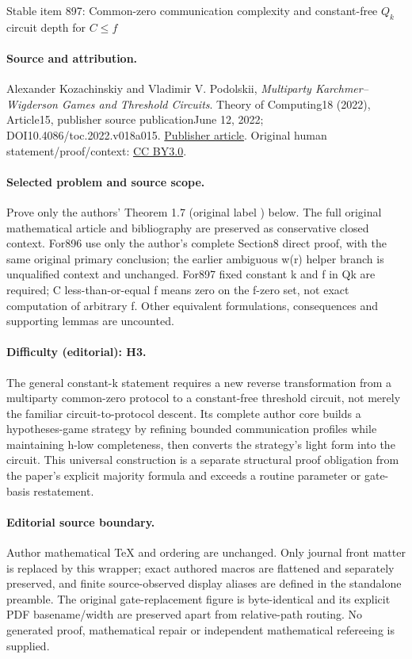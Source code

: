 \documentclass[11pt]{article}
\numberwithin{equation}{section}
\theoremstyle{definition}
\theoremstyle{plain}
\begin{document}
\begin{center}{\Large Stable item 897: Common-zero communication complexity and constant-free \(Q_k\) circuit depth for \(C\leq f\)}\end{center}
\paragraph{Source and attribution.}
Alexander Kozachinskiy and Vladimir V. Podolskii, \emph{Multiparty Karchmer--Wigderson Games and Threshold Circuits}. Theory of Computing18 (2022), Article15, publisher source publicationJune 12, 2022; DOI10.4086/toc.2022.v018a015. \href{https://theoryofcomputing.org/articles/v018a015/}{Publisher article}. Original human statement/proof/context: \href{https://creativecommons.org/licenses/by/3.0/}{CC BY3.0}.
\paragraph{Selected problem and source scope.}
Prove only the authors' Theorem 1.7 (original label ) below. The full original mathematical article and bibliography are preserved as conservative closed context. For896 use only the author's complete Section8 direct proof, with the same original primary conclusion; the earlier ambiguous w(r) helper branch is unqualified context and unchanged. For897 fixed constant k and f in Qk are required; C less-than-or-equal f means zero on the f-zero set, not exact computation of arbitrary f. Other equivalent formulations, consequences and supporting lemmas are uncounted.
\paragraph{Difficulty (editorial): H3.}
The general constant-k statement requires a new reverse transformation from a multiparty common-zero protocol to a constant-free threshold circuit, not merely the familiar circuit-to-protocol descent. Its complete author core builds a hypotheses-game strategy by refining bounded communication profiles while maintaining h-low completeness, then converts the strategy's light form into the circuit. This universal construction is a separate structural proof obligation from the paper's explicit majority formula and exceeds a routine parameter or gate-basis restatement.
\paragraph{Editorial source boundary.}
Author mathematical TeX and ordering are unchanged. Only journal front matter is replaced by this wrapper; exact authored macros are flattened and separately preserved, and finite source-observed display aliases are defined in the standalone preamble. The original gate-replacement figure is byte-identical and its explicit PDF basename/width are preserved apart from relative-path routing. No generated proof, mathematical repair or independent mathematical refereeing is supplied. 
\clearpage
\end{document}
